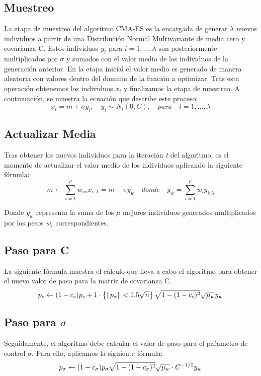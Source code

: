 \subsection{Muestreo}
La etapa de muestreo del algoritmo CMA-ES es la encargada de generar $\lambda$ nuevos individuos a partir de una Distribución Normal Multivariante de media cero y covarianza C. Estos individuos $y_{i}$ para $ i=1,...,\lambda $ son posteriormente multiplicados por $\sigma$ y sumados con el valor medio de los individuos de la generación anterior. En la etapa inicial el valor medio es generado de manera aleatoria con valores dentro del dominio de la función a optimizar. Tras esta operación obtenemos los individuos $x_{i}$ y finalizamos la etapa de muestreo. A continuación, se muestra la ecuación que describe este proceso: 
\begin{equation} \label{eq:1}
        x_{i} = m + \sigma y_{i},\quad y_{i}\sim N_{i}(0, C),\quad para\quad i=1,...,\lambda 
\end{equation}

\subsection{Actualizar Media}
Tras obtener los nuevos individuos para la iteración \textit{t} del algoritmo, es el momento de actualizar el valor medio de los individuos aplicando la siguiente fórmula: 
\begin{equation} \label{eq:2}
    m \leftarrow \sum_{i=1}^{\mu} w_{wi}x_{i:\lambda} = m + \sigma y_{w}\quad donde\quad y_{w} = \sum_{i=1}^{\mu} w_{i}y_{i:\lambda} 
\end{equation}

Donde $y_{w}$ representa la suma de los $\mu$ mejores individuos generados multiplicados por los pesos $w_{i}$ correspondientes.

\subsection{Paso para C}
La siguiente fórmula muestra el cálculo que lleva a cabo el algoritmo para obtener el nuevo valor de paso para la matriz de covarianza C.
\begin{equation} \label{eq:3}
   p_{c} \leftarrow (1 - c_{c})p_{c} + 1\cdot\left \{ \left \|p_{\sigma}\right \|< 1.5 \sqrt{n} \right \} \sqrt{1 - (1 - c_{c})^2}\sqrt{\mu_{w}}y_{w} \\
\end{equation}


\subsection{Paso para $ \sigma $}
Seguidamente, el algoritmo debe calcular el valor de paso para el paŕametro de control $\sigma$. Para ello, aplicamos la siguiente fórmula:
\begin{equation} \label{eq:4}
     p_{\sigma} \leftarrow (1 - c_{\sigma})p_{\sigma}\sqrt{1 - (1 - c_{\sigma})^2}\sqrt{\mu_{w}}\cdot C^{-1/2}y_{w} \\
\end{equation}

